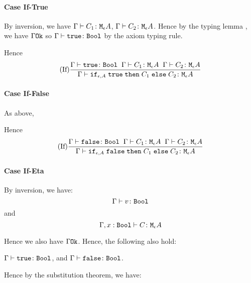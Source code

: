 {        \paragraph{Case If-True}
            By inversion, we have $\Gamma \vdash C_1 \colon \texttt{M}_{\epsilon}{A}$, $\Gamma \vdash C_2 \colon \texttt{M}_{\epsilon}{A}$. Hence by the typing lemma , we have $\Gamma \texttt{Ok}$ so $\Gamma \vdash \texttt{true} \colon \texttt{Bool}$ by the axiom typing rule.

            Hence 
            \begin{equation}
                    (\text{If}) \frac{
                        \Gamma \vdash \texttt{true} \colon \texttt{Bool}
                        \;\;
                        \Gamma \vdash C_1 \colon \texttt{M}_{\epsilon}{A}
                        \;\;
                        \Gamma \vdash C_2 \colon \texttt{M}_{\epsilon}{A}
                    }{
                        \Gamma \vdash \texttt{if}_{\epsilon, A}\;\texttt{true}\; \texttt{then}\; C_1 \;\texttt{else} \; C_2 \colon \texttt{M}_{\epsilon}{A}
                    }
            \end{equation}
        \paragraph{Case If-False}
        As above,

        Hence 
        \begin{equation}
            (\text{If}) \frac{
                \Gamma \vdash \texttt{false} \colon \texttt{Bool}
                \;\;
                \Gamma \vdash C_1 \colon \texttt{M}_{\epsilon}{A}
                \;\;
                \Gamma \vdash C_2 \colon \texttt{M}_{\epsilon}{A}
            }{
                \Gamma \vdash \texttt{if}_{\epsilon, A}\;\texttt{false}\; \texttt{then}\; C_1 \;\texttt{else} \; C_2 \colon \texttt{M}_{\epsilon}{A}
            }
    \end{equation}

    \paragraph{Case If-Eta}
        By inversion, we have:
        \begin{equation}
            \Gamma \vdash v \colon \texttt{Bool}
        \end{equation}
        and
        \begin{equation}
            \Gamma, x:\texttt{Bool} \vdash C \colon \texttt{M}_{\epsilon}{A}
        \end{equation}
        
        Hence we also have $\Gamma \texttt{Ok}$. Hence, the following also hold:

        $\Gamma \vdash \texttt{true} \colon \texttt{Bool}$, and $\Gamma \vdash \texttt{false} \colon \texttt{Bool}$.

        Hence by the substitution theorem, we have:

}
